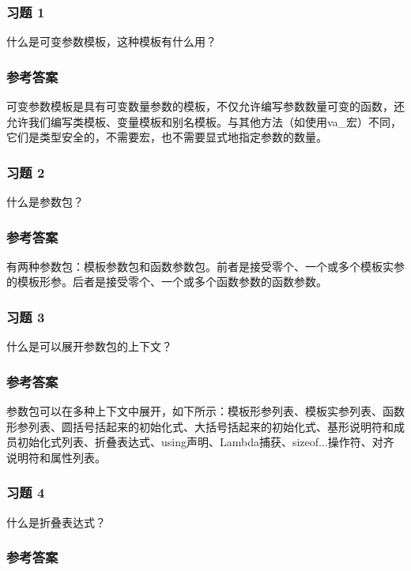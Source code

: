 \subsubsection{习题 1}

什么是可变参数模板，这种模板有什么用？

\subsubsection{参考答案}

可变参数模板是具有可变数量参数的模板，不仅允许编写参数数量可变的函数，还允许我们编写类模板、变量模板和别名模板。与其他方法（如使用va\_宏）不同，它们是类型安全的，不需要宏，也不需要显式地指定参数的数量。


\subsubsection{习题 2}

什么是参数包？

\subsubsection{参考答案}

有两种参数包：模板参数包和函数参数包。前者是接受零个、一个或多个模板实参的模板形参。后者是接受零个、一个或多个函数参数的函数参数。

\subsubsection{习题 3}

什么是可以展开参数包的上下文？

\subsubsection{参考答案}

参数包可以在多种上下文中展开，如下所示：模板形参列表、模板实参列表、函数形参列表、圆括号括起来的初始化式、大括号括起来的初始化式、基形说明符和成员初始化式列表、折叠表达式、using声明、Lambda捕获、sizeof...操作符、对齐说明符和属性列表。

\subsubsection{习题 4}

什么是折叠表达式？

\subsubsection{参考答案}

